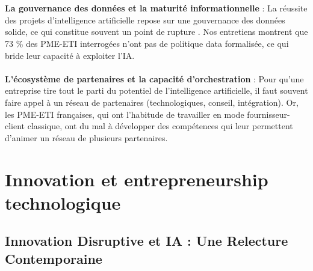 \\\\
\textbf{La gouvernance des données et la maturité informationnelle} : La réussite des projets d’intelligence artificielle repose sur une gouvernance des données solide, ce qui constitue souvent un point de rupture \cite{wang2024data_governance}. Nos entretiens montrent que 73 \% des PME-ETI interrogées n’ont pas de politique data formalisée, ce qui bride leur capacité à exploiter l’IA.
\\\\
\textbf{L'écosystème de partenaires et la capacité d'orchestration} : Pour qu’une entreprise tire tout le parti du potentiel de l’intelligence artificielle, il faut souvent faire appel à un réseau de partenaires (technologiques, conseil, intégration). Or, les PME-ETI françaises, qui ont l’habitude de travailler en mode fournisseur-client classique, ont du mal à développer des compétences qui leur permettent d’animer un réseau de plusieurs partenaires.

\section{Innovation et entrepreneurship technologique}

\subsection{Innovation Disruptive et IA : Une Relecture Contemporaine}

